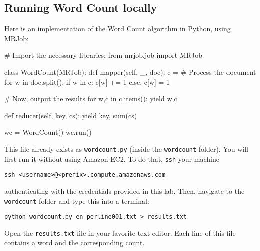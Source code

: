 \subsection{Running Word Count locally}

Here is an implementation of the Word Count algorithm in Python, using MRJob:

\begin{python}
# Import the necessary libraries:
from mrjob.job import MRJob

class WordCount(MRJob):
    def mapper(self, _, doc):
        c = {}
        # Process the document
        for w in doc.split():
            if w in c:
                c[w] += 1
            else:
                c[w] = 1

        # Now, output the results
        for w,c in c.items():
            yield w,c

    def reducer(self, key, cs):
        yield key, sum(cs)

wc = WordCount()
wc.run()
\end{python}

This file already exists as \texttt{wordcount.py} (inside the
\texttt{wordcount} folder). You will first run it without using Amazon
EC2. To do that, {\texttt{ssh}} your machine
\begin{verbatim}
ssh <username>@<prefix>.compute.amazonaws.com
\end{verbatim}
authenticating with the credentials provided in this lab.
Then, navigate to the \texttt{wordcount} folder and type this into a terminal:

\begin{verbatim}
python wordcount.py en_perline001.txt > results.txt
\end{verbatim}

Open the \texttt{results.txt} file in your favorite text editor. Each line of this file contains a word and the corresponding count.

